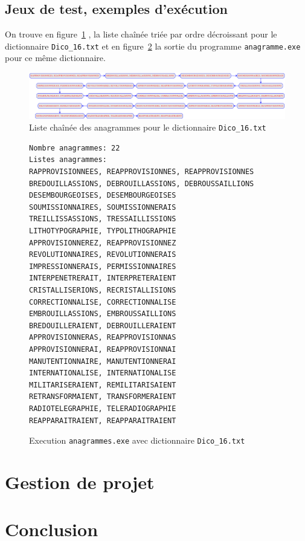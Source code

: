 \documentclass{article} %
\begin{document}
\subsection{Jeux de test, exemples d'exécution}

On trouve en figure~\ref{fig:prog_3_2} , la liste chaînée triée par ordre décroissant pour le dictionnaire \texttt{Dico\_16.txt} et en figure~\ref{fig:prog_3_1} la sortie du programme \texttt{anagramme.exe} pour ce même dictionnaire.

\begin{figure}[H]
  \begin{center}
    \includegraphics[scale=0.28]{Img_prog3/liste_chaine.eps}
  \end{center}
  \caption{Liste chaînée des anagrammes pour le dictionnaire \texttt{Dico\_16.txt}}
  \label{fig:prog_3_2}
\end{figure}

\begin{figure}[H]
  \begin{lstlisting}
Nombre anagrammes: 22
Listes anagrammes:
RAPPROVISIONNEES, REAPPROVISIONNES, REAPPROVISIONNES
BREDOUILLASSIONS, DEBROUILLASSIONS, DEBROUSSAILLIONS
DESEMBOURGEOISES, DESEMBOURGEOISES
SOUMISSIONNAIRES, SOUMISSIONNERAIS
TREILLISSASSIONS, TRESSAILLISSIONS
LITHOTYPOGRAPHIE, TYPOLITHOGRAPHIE
APPROVISIONNEREZ, REAPPROVISIONNEZ
REVOLUTIONNAIRES, REVOLUTIONNERAIS
IMPRESSIONNERAIS, PERMISSIONNAIRES
INTERPENETRERAIT, INTERPRETERAIENT
CRISTALLISERIONS, RECRISTALLISIONS
CORRECTIONNALISE, CORRECTIONNALISE
EMBROUILLASSIONS, EMBROUSSAILLIONS
BREDOUILLERAIENT, DEBROUILLERAIENT
APPROVISIONNERAS, REAPPROVISIONNAS
APPROVISIONNERAI, REAPPROVISIONNAI
MANUTENTIONNAIRE, MANUTENTIONNERAI
INTERNATIONALISE, INTERNATIONALISE
MILITARISERAIENT, REMILITARISAIENT
RETRANSFORMAIENT, TRANSFORMERAIENT
RADIOTELEGRAPHIE, TELERADIOGRAPHIE
REAPPARAITRAIENT, REAPPARAITRAIENT\end{lstlisting}
\caption{Execution \texttt{anagrammes.exe} avec dictionnaire \texttt{Dico\_16.txt}}
\label{fig:prog_3_1}
\end{figure}



\section{Gestion de projet}
\section{Conclusion}



\nocite{*}



\end{document}
